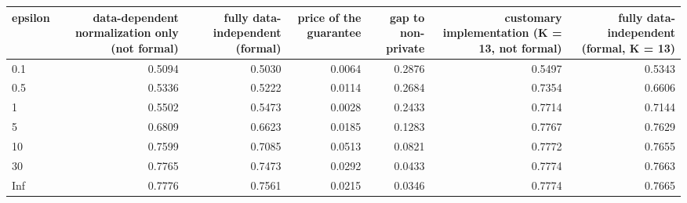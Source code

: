 \begin{tabular}{lrrrrrr}
  \toprule
epsilon & data-dependent normalization only (not formal) & fully data-independent (formal) & price of the guarantee & gap to non-private & customary implementation (K = 13, not formal) & fully data-independent (formal, K = 13) \\ 
  \midrule
0.1 & 0.5094 & 0.5030 & 0.0064 & 0.2876 & 0.5497 & 0.5343 \\ 
  0.5 & 0.5336 & 0.5222 & 0.0114 & 0.2684 & 0.7354 & 0.6606 \\ 
  1 & 0.5502 & 0.5473 & 0.0028 & 0.2433 & 0.7714 & 0.7144 \\ 
  5 & 0.6809 & 0.6623 & 0.0185 & 0.1283 & 0.7767 & 0.7629 \\ 
  10 & 0.7599 & 0.7085 & 0.0513 & 0.0821 & 0.7772 & 0.7655 \\ 
  30 & 0.7765 & 0.7473 & 0.0292 & 0.0433 & 0.7774 & 0.7663 \\ 
  Inf & 0.7776 & 0.7561 & 0.0215 & 0.0346 & 0.7774 & 0.7665 \\ 
   \bottomrule
\end{tabular}
